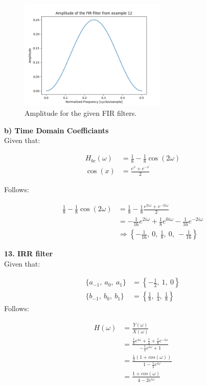 \begin{figure}[h]
	\centering
	\includegraphics[width=7cm]{img/ex_12.png}
	\captionsetup{width=5cm}
	\caption{Amplitude for the given FIR filters.}
\end{figure}

\newpage

\textbf{b) Time Domain Coefficiants} \\

Given that:

\begin{align}
	H_{bc}(\omega) &= \frac{1}{8} - \frac{1}{8} \cos(2\omega) \\
	\cos(x) &= \frac{e^x + e^{-x}}{2}
\end{align}

Follows:

\begin{align*}
	\frac{1}{8} - \frac{1}{8} \cos(2\omega) &= \frac{1}{8} - \frac{1}{8} \frac{e^{2i\omega} + e^{-2i\omega}}{2} \\ 
	&= -\frac{1}{16} e^{2i\omega} + \frac{1}{8} e^{0i\omega} - \frac{1}{16} e^{-2i\omega} \\
	&\Rightarrow \left\{ -\frac{1}{16},\ 0,\ \frac{1}{8},\ 0,\ -\frac{1}{16} \right\}
\end{align*}

\textbf{\large 13. IRR filter}
\\

Given that:

\begin{align}
	\{a_{-1},\ a_0,\ a_1\} &= \left\{-\frac{1}{2},\ 1,\ 0\right\} \\
	\{b_{-1},\ b_0,\ b_1\} &= \left\{\frac{1}{8},\ \frac{1}{4},\ \frac{1}{8}\right\}
\end{align}
Follows:

\begin{align*}
	H(\omega) &= \frac{Y(\omega)}{X(\omega)}\\
	&= \frac{\frac{1}{8} e^{i\omega} + \frac{1}{4} + \frac{1}{8} e^{-i\omega}}{-\frac{1}{2} e^{i\omega} + 1}\\
	&= \frac{\frac{1}{4} (1 + cos(\omega))}{1 - \frac{1}{2} e^{i\omega}}\\
	&= \frac{1 + cos(\omega)}{4 - 2 e^{i\omega}}
\end{align*}

